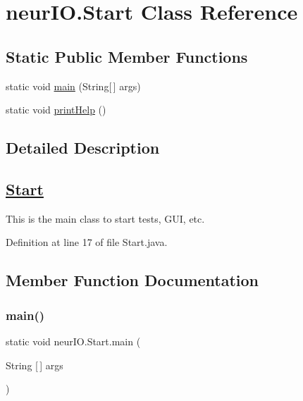 \hypertarget{classneur_i_o_1_1_start}{}\section{neur\+I\+O.\+Start Class Reference}
\label{classneur_i_o_1_1_start}
\subsection*{Static Public Member Functions}
\begin{DoxyCompactItemize}
\item 
static void \hyperlink{classneur_i_o_1_1_start_aef3f6b2b34c677ae10ff69b507a2d4b4}{main} (String\mbox{[}$\,$\mbox{]} args)
\item 
static void \hyperlink{classneur_i_o_1_1_start_ae057e60dad95a9bd37e41c860cae2fab}{print\+Help} ()
\end{DoxyCompactItemize}


\subsection{Detailed Description}
\subsection*{\hyperlink{classneur_i_o_1_1_start}{Start} }

This is the main class to start tests, G\+UI, etc. 

Definition at line 17 of file Start.\+java.



\subsection{Member Function Documentation}
\mbox{\label{classneur_i_o_1_1_start_aef3f6b2b34c677ae10ff69b507a2d4b4}} 
\subsubsection{\texorpdfstring{main()}{main()}}
{\footnotesize\ttfamily static void neur\+I\+O.\+Start.\+main (\begin{DoxyParamCaption}\item[{String \mbox{[}$\,$\mbox{]}}]{args }\end{DoxyParamCaption})\hspace{0.3cm}{\ttfamily [static]}}


